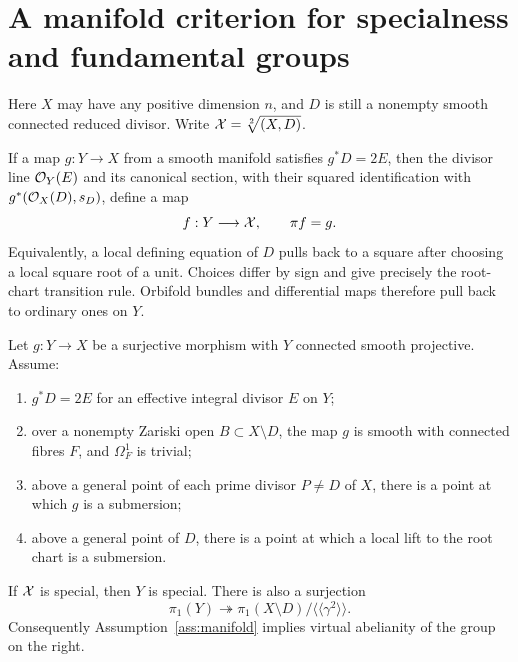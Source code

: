 \section{A manifold criterion for specialness and fundamental groups}

Here $X$ may have any positive dimension $n$, and $D$ is still a nonempty smooth connected reduced divisor. Write $\mathcal X=\sqrt[2]{(X,D)}$.

If a map $g:Y\to X$ from a smooth manifold satisfies $g^*D=2E$, then the divisor line $\mathcal O_Y(E)$ and its canonical section, with their squared identification with $g^*(\mathcal O_X(D),s_D)$, define a map
\[
 f:Y\longrightarrow\mathcal X,\qquad \pi f=g.
\]
Equivalently, a local defining equation of $D$ pulls back to a square after choosing a local square root of a unit. Choices differ by sign and give precisely the root-chart transition rule. Orbifold bundles and differential maps therefore pull back to ordinary ones on $Y$.

\begin{proposition}\label{prop:transfer}
Let $g:Y\to X$ be a surjective morphism with $Y$ connected smooth projective. Assume:
\begin{enumerate}
\item\label{item:even} $g^*D=2E$ for an effective integral divisor $E$ on $Y$;
\item\label{item:fibres} over a nonempty Zariski open $B\subset X\setminus D$, the map $g$ is smooth with connected fibres $F$, and $\Omega_F^1$ is trivial;
\item\label{item:ordinary} above a general point of each prime divisor $P\ne D$ of $X$, there is a point at which $g$ is a submersion;
\item\label{item:root} above a general point of $D$, there is a point at which a local lift to the root chart is a submersion.
\end{enumerate}
If $\mathcal X$ is special, then $Y$ is special. There is also a surjection
\begin{equation}\label{eq:group-surjection}
 \pi_1(Y)\twoheadrightarrow
 \pi_1(X\setminus D)/\langle\!\langle\gamma^2\rangle\!\rangle.
\end{equation}
Consequently Assumption~\ref{ass:manifold} implies virtual abelianity of the group on the right.
\end{proposition}


